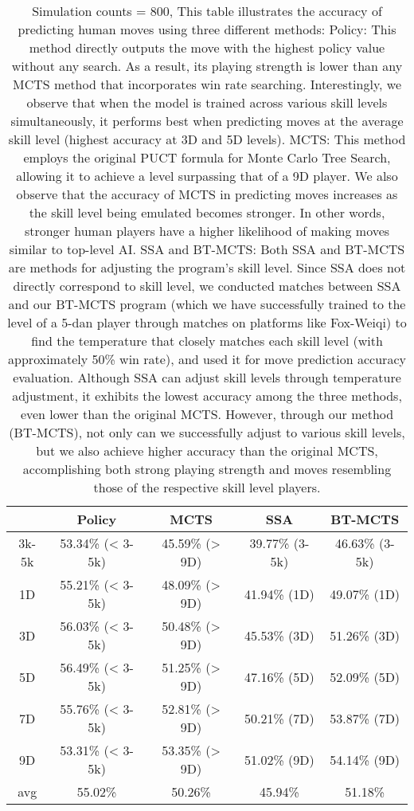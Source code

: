 \begin{table}[h]
\centering
\begin{tabular}{ccccc}
\toprule
& Policy & MCTS & SSA & BT-MCTS \\ \midrule
3k-5k & 53.34\% (< 3-5k) & 45.59\% (> 9D) & 39.77\% (3-5k) & 46.63\% (3-5k) \\
1D & 55.21\% (< 3-5k) & 48.09\% (> 9D) & 41.94\% (1D) & 49.07\% (1D) \\
3D & 56.03\% (< 3-5k) & 50.48\% (> 9D) & 45.53\% (3D) & 51.26\% (3D) \\
5D & 56.49\% (< 3-5k) & 51.25\% (> 9D) & 47.16\% (5D) & 52.09\% (5D) \\
7D & 55.76\% (< 3-5k) & 52.81\% (> 9D) & 50.21\% (7D) & 53.87\% (7D) \\
9D & 53.31\% (< 3-5k) & 53.35\% (> 9D) & 51.02\% (9D) & 54.14\% (9D) \\
\midrule
avg & 55.02\% & 50.26\% & 45.94\% & 51.18\% \\
\bottomrule
\end{tabular}
\caption{Simulation counts = 800, This table illustrates the accuracy of predicting human moves using three different methods:
Policy: This method directly outputs the move with the highest policy value without any search. As a result, its playing strength is lower than any MCTS method that incorporates win rate searching. Interestingly, we observe that when the model is trained across various skill levels simultaneously, it performs best when predicting moves at the average skill level (highest accuracy at 3D and 5D levels).
MCTS: This method employs the original PUCT formula for Monte Carlo Tree Search, allowing it to achieve a level surpassing that of a 9D player. We also observe that the accuracy of MCTS in predicting moves increases as the skill level being emulated becomes stronger. In other words, stronger human players have a higher likelihood of making moves similar to top-level AI.
SSA and BT-MCTS: Both SSA and BT-MCTS are methods for adjusting the program's skill level. Since SSA does not directly correspond to skill level, we conducted matches between SSA and our BT-MCTS program (which we have successfully trained to the level of a 5-dan player through matches on platforms like Fox-Weiqi) to find the temperature that closely matches each skill level (with approximately 50\% win rate), and used it for move prediction accuracy evaluation.
Although SSA can adjust skill levels through temperature adjustment, it exhibits the lowest accuracy among the three methods, even lower than the original MCTS. However, through our method (BT-MCTS), not only can we successfully adjust to various skill levels, but we also achieve higher accuracy than the original MCTS, accomplishing both strong playing strength and moves resembling those of the respective skill level players.}
\end{table}